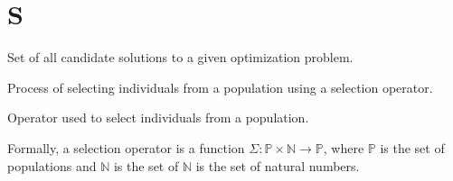   \section*{S}
    \begin{definition}
    \label{def:search_space}
      Set of all candidate solutions to a given optimization problem.
    \end{definition}
    
    \begin{definition}[Selection]
    \label{def:selection}
      Process of selecting individuals from a population using a selection operator.
    \end{definition}

    \begin{definition}
    \label{def:selection_operator}
      Operator used to select individuals from a population.

      Formally, a selection operator is a function \(\Sigma : \mathbb{P} \times \mathbb{N} \to
      \mathbb{P}\), where \(\mathbb{P}\) is the set of populations and \(\mathbb{N}\) is the set of
      \(\mathbb{N}\) is the set of natural numbers.
    \end{definition}
